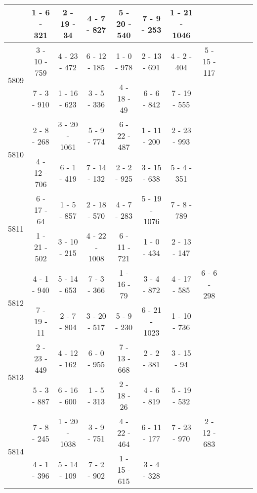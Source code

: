 \begin{longtable}{c | c | c | c | c | c | c | c | c | c | c | c}
&
1 - 6 - 321
&
2 - 19 - 34
&
4 - 7 - 827
&
5 - 20 - 540
&
7 - 9 - 253
&
1 - 21 - 1046
&\space\\\hline
\multirow{2}{*}{5809}
& 3 - 10 - 759
&
4 - 23 - 472
&
6 - 12 - 185
&
1 - 0 - 978
&
2 - 13 - 691
&
4 - 2 - 404
&
5 - 15 - 117
\\* \space
&
7 - 3 - 910
&
1 - 16 - 623
&
3 - 5 - 336
&
4 - 18 - 49
&
6 - 6 - 842
&
7 - 19 - 555
&\space\\\hline
\multirow{2}{*}{5810}
& 2 - 8 - 268
&
3 - 20 - 1061
&
5 - 9 - 774
&
6 - 22 - 487
&
1 - 11 - 200
&
2 - 23 - 993
&\space\\* \space
&
4 - 12 - 706
&
6 - 1 - 419
&
7 - 14 - 132
&
2 - 2 - 925
&
3 - 15 - 638
&
5 - 4 - 351
&\space\\\hline
\multirow{2}{*}{5811}
& 6 - 17 - 64
&
1 - 5 - 857
&
2 - 18 - 570
&
4 - 7 - 283
&
5 - 19 - 1076
&
7 - 8 - 789
&\space\\* \space
&
1 - 21 - 502
&
3 - 10 - 215
&
4 - 22 - 1008
&
6 - 11 - 721
&
1 - 0 - 434
&
2 - 13 - 147
&\space\\\hline
\multirow{2}{*}{5812}
& 4 - 1 - 940
&
5 - 14 - 653
&
7 - 3 - 366
&
1 - 16 - 79
&
3 - 4 - 872
&
4 - 17 - 585
&
6 - 6 - 298
\\* \space
&
7 - 19 - 11
&
2 - 7 - 804
&
3 - 20 - 517
&
5 - 9 - 230
&
6 - 21 - 1023
&
1 - 10 - 736
&\space\\\hline
\multirow{2}{*}{5813}
& 2 - 23 - 449
&
4 - 12 - 162
&
6 - 0 - 955
&
7 - 13 - 668
&
2 - 2 - 381
&
3 - 15 - 94
&\space\\* \space
&
5 - 3 - 887
&
6 - 16 - 600
&
1 - 5 - 313
&
2 - 18 - 26
&
4 - 6 - 819
&
5 - 19 - 532
&\space\\\hline
\multirow{2}{*}{5814}
& 7 - 8 - 245
&
1 - 20 - 1038
&
3 - 9 - 751
&
4 - 22 - 464
&
6 - 11 - 177
&
7 - 23 - 970
&
2 - 12 - 683
\\* \space
&
4 - 1 - 396
&
5 - 14 - 109
&
7 - 2 - 902
&
1 - 15 - 615
&
3 - 4 - 328

\end{longtable}
